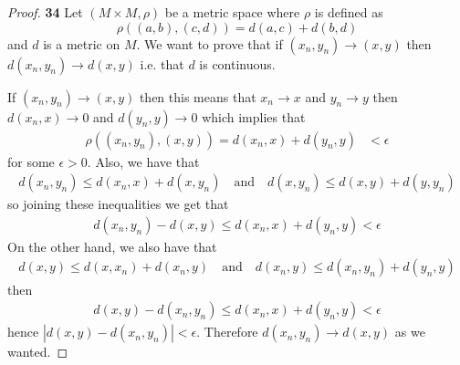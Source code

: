\documentclass[11pt]{article}
\theoremstyle{definition}
\begin{document}
    \begin{proof}{\textbf{34}}
        Let $(M\times M, \rho)$ be a metric space where $\rho$ is defined as
        $$\rho((a,b),(c,d)) = d(a,c) + d(b,d)$$
        and $d$ is a metric on $M$. We want to prove that if
        $(x_n, y_n) \to (x, y)$ then $d(x_n, y_n) \to d(x,y)$ i.e. that 
        $d$ is continuous.

        If $(x_n, y_n) \to (x, y)$ then this means
        that $x_n \to x$ and $y_n \to y$ then $d(x_n,x) \to 0$ and
        $d(y_n, y) \to 0$ which implies that
        \begin{align*}
            \rho((x_n,y_n),(x,y)) = d(x_n,x) + d(y_n,y) &< \epsilon
        \end{align*}
        for some $\epsilon > 0$. Also, we have that
        \begin{align*}
            d(x_n,y_n) \leq d(x_n,x) + d(x,y_n) \quad\text{and}\quad
            d(x,y_n) \leq d(x,y) + d(y,y_n) 
        \end{align*}
        so joining these inequalities we get that
        \begin{align*}
            d(x_n,y_n) - d(x,y) \leq d(x_n,x) + d(y_n,y) < \epsilon
        \end{align*}
        On the other hand, we also have that
        \begin{align*}
            d(x,y) \leq d(x,x_n) + d(x_n,y) \quad\text{and}\quad
            d(x_n,y) \leq d(x_n,y_n) + d(y_n,y) 
        \end{align*}
        then
        \begin{align*}
            d(x,y) - d(x_n,y_n) \leq d(x_n,x) + d(y_n,y) < \epsilon
        \end{align*}
        hence $|d(x,y) - d(x_n,y_n)| < \epsilon$.
        Therefore $d(x_n,y_n) \to d(x,y)$ as we wanted.
    \end{proof}
\cleardoublepage
\end{document}
